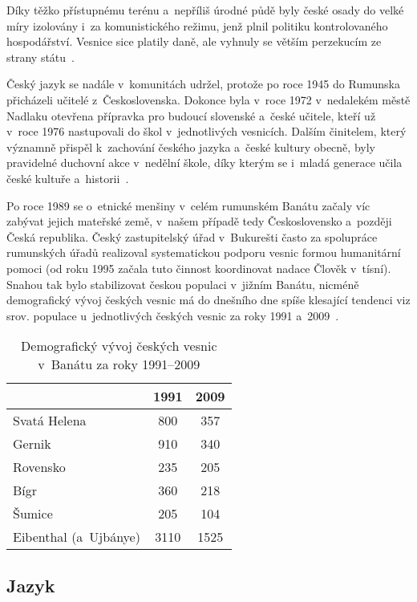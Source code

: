 Díky těžko přístupnému terénu a~nepříliš úrodné půdě byly české osady do velké míry izolovány i~za komunistického režimu, jenž plnil politiku kontrolovaného hospodářství. Vesnice sice platily daně, ale vyhnuly se větším perzekucím ze strany státu~\parencite{Frnochova2012}.

Český jazyk se nadále v~komunitách udržel, protože po roce 1945 do Rumunska přicházeli učitelé z~Československa. Dokonce byla v~roce 1972 v~nedalekém městě Nadlaku otevřena přípravka pro budoucí slovenské a~české učitele, kteří už v~roce 1976 nastupovali do škol v~jednotlivých vesnicích. Dalším činitelem, který významně přispěl k~zachování českého jazyka a~české kultury obecně, byly pravidelné duchovní akce v~nedělní škole, díky kterým se i~mladá generace učila české kultuře a~historii~\parencite{Vaculik2009b}.

Po roce 1989 se o~etnické menšiny v~celém rumunském Banátu začaly víc zabývat jejich mateřské země, v~našem případě tedy Československo a~později Česká republika. Český zastupitelský úřad v~Bukurešti často za spolupráce rumunských úřadů realizoval systematickou podporu vesnic formou humanitární pomoci (od roku 1995 začala tuto činnost koordinovat nadace Člověk v~tísní). Snahou tak bylo stabilizovat českou populaci v~jižním Banátu, nicméně demografický vývoj českých vesnic má do dnešního dne spíše klesající tendenci viz srov. populace u~jednotlivých českých vesnic za roky 1991 a~2009~\parencite{Gecse2013}.

\begin{table}[h!]
\centering
\begin{tabular}{||l c c||} 
 \hline
   & 1991 & 2009 \\ [0.5ex] 
 \hline\hline
 Svatá Helena & 800 & 357 \\ 
 \hline
 Gernik & 910 & 340 \\
 \hline
 Rovensko & 235 & 205 \\
 \hline
 Bígr & 360 & 218 \\
 \hline
 Šumice & 205 & 104  \\ [1ex] 
 \hline
  Eibenthal (a~Ujbánye) & 3110 & 1525 \\ [1ex] 
 \hline
\end{tabular}
\caption*{Demografický vývoj českých vesnic v~Banátu za roky 1991–2009}
\label{table:1}
\end{table}

\hypertarget{jazyk}{%
\subsection*{Jazyk}\label{jazyk}}

